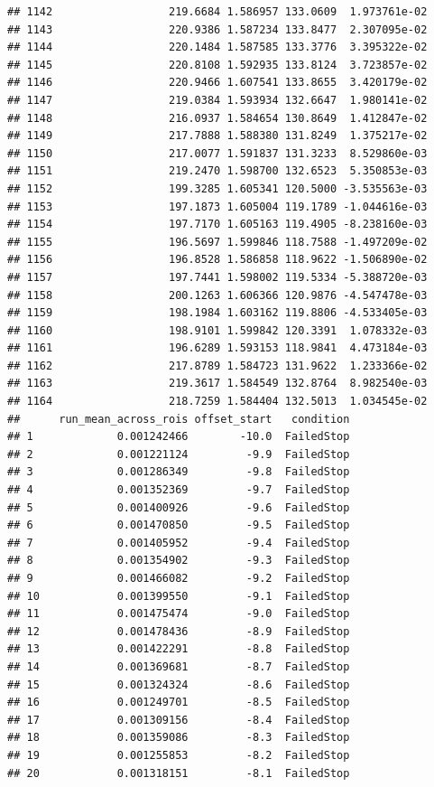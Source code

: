 \documentclass[
]{article}
\begin{document}
\begin{verbatim}
## 1142                  219.6684 1.586957 133.0609  1.973761e-02
## 1143                  220.9386 1.587234 133.8477  2.307095e-02
## 1144                  220.1484 1.587585 133.3776  3.395322e-02
## 1145                  220.8108 1.592935 133.8124  3.723857e-02
## 1146                  220.9466 1.607541 133.8655  3.420179e-02
## 1147                  219.0384 1.593934 132.6647  1.980141e-02
## 1148                  216.0937 1.584654 130.8649  1.412847e-02
## 1149                  217.7888 1.588380 131.8249  1.375217e-02
## 1150                  217.0077 1.591837 131.3233  8.529860e-03
## 1151                  219.2470 1.598700 132.6523  5.350853e-03
## 1152                  199.3285 1.605341 120.5000 -3.535563e-03
## 1153                  197.1873 1.605004 119.1789 -1.044616e-03
## 1154                  197.7170 1.605163 119.4905 -8.238160e-03
## 1155                  196.5697 1.599846 118.7588 -1.497209e-02
## 1156                  196.8528 1.586858 118.9622 -1.506890e-02
## 1157                  197.7441 1.598002 119.5334 -5.388720e-03
## 1158                  200.1263 1.606366 120.9876 -4.547478e-03
## 1159                  198.1984 1.603162 119.8806 -4.533405e-03
## 1160                  198.9101 1.599842 120.3391  1.078332e-03
## 1161                  196.6289 1.593153 118.9841  4.473184e-03
## 1162                  217.8789 1.584723 131.9622  1.233366e-02
## 1163                  219.3617 1.584549 132.8764  8.982540e-03
## 1164                  218.7259 1.584404 132.5013  1.034545e-02
##      run_mean_across_rois offset_start   condition
## 1             0.001242466        -10.0  FailedStop
## 2             0.001221124         -9.9  FailedStop
## 3             0.001286349         -9.8  FailedStop
## 4             0.001352369         -9.7  FailedStop
## 5             0.001400926         -9.6  FailedStop
## 6             0.001470850         -9.5  FailedStop
## 7             0.001405952         -9.4  FailedStop
## 8             0.001354902         -9.3  FailedStop
## 9             0.001466082         -9.2  FailedStop
## 10            0.001399550         -9.1  FailedStop
## 11            0.001475474         -9.0  FailedStop
## 12            0.001478436         -8.9  FailedStop
## 13            0.001422291         -8.8  FailedStop
## 14            0.001369681         -8.7  FailedStop
## 15            0.001324324         -8.6  FailedStop
## 16            0.001249701         -8.5  FailedStop
## 17            0.001309156         -8.4  FailedStop
## 18            0.001359086         -8.3  FailedStop
## 19            0.001255853         -8.2  FailedStop
## 20            0.001318151         -8.1  FailedStop

\end{verbatim}
\end{document}
